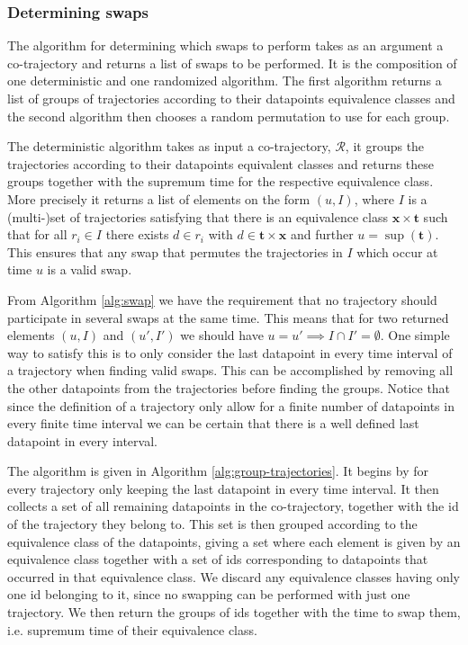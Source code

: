 \documentclass[12pt]{article}
\newcommand{\data}{d}
\newcommand{\traj}{r}
\newcommand{\cotraj}{\mathcal{R}}
\newcommand{\swaptime}{u}
\newcommand{\locint}{\mathbf{x}}
\newcommand{\timint}{\mathbf{t}}
\theoremstyle{definition}
\begin{document}
\subsubsection{Determining swaps}
\label{sec:determining-swaps}

The algorithm for determining which swaps to perform takes as an
argument a co-trajectory and returns a list of swaps to be performed.
It is the composition of one deterministic and one randomized
algorithm. The first algorithm returns a list of groups of
trajectories according to their datapoints equivalence classes and
the second algorithm then chooses a random permutation to use for each
group.

The deterministic algorithm takes as input a co-trajectory,
\(\cotraj\), it groups the trajectories according to their datapoints
equivalent classes and returns these groups together with the supremum
time for the respective equivalence class. More precisely it returns a
list of elements on the form \((\swaptime, I)\), where \(I\) is a
(multi-)set of trajectories satisfying that there is an equivalence
class \(\locint \times \timint\) such that for all \(\traj_{i} \in I\)
there exists \(\data \in \traj_{i}\) with
\(\data \in \timint \times \locint\) and further
\(\swaptime = \sup(\timint)\). This ensures that any swap that
permutes the trajectories in \(I\) which occur at time \(\swaptime\)
is a valid swap.

From Algorithm \ref{alg:swap} we have the requirement that no
trajectory should participate in several swaps at the same time. This
means that for two returned elements \((\swaptime, I)\) and
\((\swaptime', I')\) we should have
\(\swaptime = \swaptime' \implies I \cap I' = \emptyset\). One simple
way to satisfy this is to only consider the last datapoint in every
time interval of a trajectory when finding valid swaps. This can be
accomplished by removing all the other datapoints from the
trajectories before finding the groups. Notice that since the
definition of a trajectory only allow for a finite number of
datapoints in every finite time interval we can be certain that there
is a well defined last datapoint in every interval.

The algorithm is given in Algorithm \ref{alg:group-trajectories}. It
begins by for every trajectory only keeping the last datapoint in
every time interval. It then collects a set of all remaining
datapoints in the co-trajectory, together with the id of the
trajectory they belong to. This set is then grouped according to the
equivalence class of the datapoints, giving a set where each element
is given by an equivalence class together with a set of ids
corresponding to datapoints that occurred in that equivalence class.
We discard any equivalence classes having only one id belonging to it,
since no swapping can be performed with just one trajectory. We then
return the groups of ids together with the time to swap them, i.e.
supremum time of their equivalence class.
\end{document}

